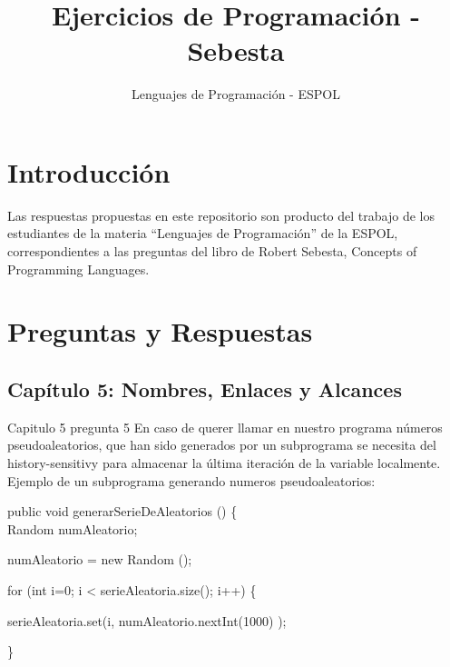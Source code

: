 \documentclass[12pt,oneside]{article}
\title{Ejercicios de Programación - Sebesta}
\author{Lenguajes de Programación - ESPOL}
\begin{document}
\maketitle

\section{Introducción}
Las respuestas propuestas en este repositorio son producto del trabajo de los estudiantes de la materia ``Lenguajes de Programación'' de la ESPOL, correspondientes a las preguntas del libro de Robert Sebesta, Concepts of Programming Languages.

\section{Preguntas y Respuestas}

\subsection{Capítulo 5: Nombres, Enlaces y Alcances}
%

Capitulo 5 pregunta 5
En caso de querer llamar en nuestro programa números pseudoaleatorios, que han sido generados por un subprograma se necesita del history-sensitivy para almacenar la última iteración de la variable localmente. 
Ejemplo de un subprograma generando numeros pseudoaleatorios:

 public void generarSerieDeAleatorios () \{  \\

        Random numAleatorio;

        numAleatorio = new Random ();

        for (int i=0; i < serieAleatoria.size(); i++)  \{

        serieAleatoria.set(i, numAleatorio.nextInt(1000) );

         \}
%
%
\end{document}
